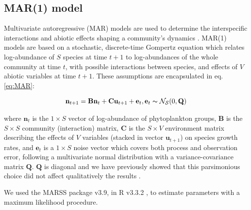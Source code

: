 \documentclass[10pt]{article}
\begin{document}
\subsection*{MAR(1) model}

Multivariate autoregressive (MAR) models are used to determine the
interspecific interactions and abiotic effects shaping a community's
dynamics \citep{ives_estimating_2003}. MAR(1) models are based
on a stochastic, discrete-time Gompertz equation which relates log-abundance
of $S$ species at time $t+1$ to log-abundances of the whole community at time $t$, with possible interactions between species, and effects of $V$ abiotic variables at time
$t+1$. These assumptions are encapsulated in eq. \ref{eq:MAR}:

\begin{equation}
\mathbf{n}_{t+1}=\mathbf{B}\mathbf{n}_{t}+\textbf{C}\textbf{u}_{t+1}+\mathbf{e}_{t},\mathbf{e}_{t}\thicksim\mathcal{{N_{S}}}(0,\mathbf{Q})\label{eq:MAR}
\end{equation}

where $\mathbf{n}_{\ensuremath{t}}$ is the $1\times S$ vector of log-abundance of phytoplankton groups, $\mathbf{B}$ is the
$S\times S$ community (interaction) matrix, $\mathbf{C}$ is the $S\times V$
environment matrix describing the effects of $V$ variables (stacked
in vector $\mathbf{u}_{t+1}$) on species growth rates, and $\mathbf{e}_{t}$
is a $1\times S$ noise vector which covers both process and observation
error, following a multivariate normal distribution with a variance-covariance
matrix $\mathbf{Q}$. $\mathbf{Q}$ is diagonal and we have previously
showed that this parsimonious choice did not affect qualitatively
the results \citep{barraquand_coastal_2018}.

We used the MARSS package \citep{holmes_analysis_2014} v3.9, in
R v3.3.2 \citep{venables_r_2013}, to estimate parameters with
a maximum likelihood procedure.
\end{document}
